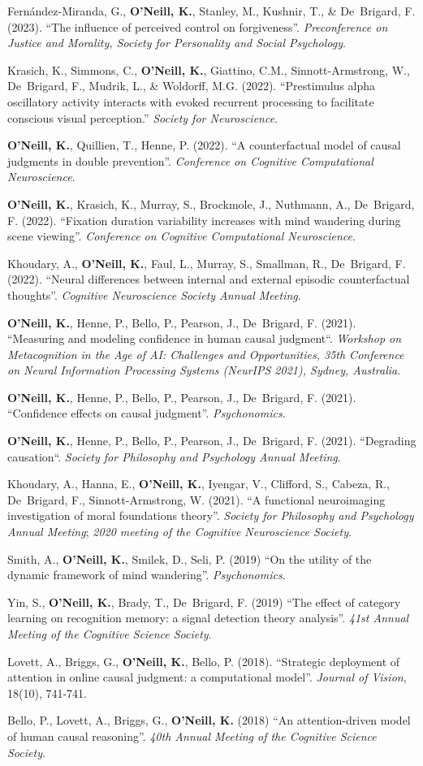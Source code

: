 Fern\'{a}ndez-Miranda, G., \textbf{O’Neill, K.}, Stanley, M., Kushnir,
T., \& De~Brigard, F. (2023). ``The influence of perceived control on
forgiveness''. \emph{Preconference on Justice and Morality, Society
for Personality and Social Psychology}.

Krasich, K., Simmons, C., \textbf{O'Neill, K.}, Giattino, C.M.,
Sinnott-Armstrong, W., De~Brigard, F., Mudrik, L., \& Woldorff,
M.G. (2022). ``Prestimulus alpha oscillatory activity interacts with
evoked recurrent processing to facilitate conscious visual
perception.'' \emph{Society for Neuroscience}.

\textbf{O'Neill, K.}, Quillien, T., Henne, P. (2022). ``A
counterfactual model of causal judgments in double
prevention''. \emph{Conference on Cognitive Computational
Neuroscience}.

\textbf{O'Neill, K.}, Krasich, K., Murray, S., Brockmole, J.,
Nuthmann, A., De~Brigard, F. (2022). ``Fixation duration variability
increases with mind wandering during scene viewing''. \emph{Conference
on Cognitive Computational Neuroscience}.

Khoudary, A., \textbf{O’Neill, K.}, Faul, L., Murray, S., Smallman,
R., De~Brigard, F. (2022). ``Neural differences between internal and
external episodic counterfactual thoughts''. \emph{Cognitive
Neuroscience Society Annual Meeting}.

\textbf{O'Neill, K.}, Henne, P., Bello, P., Pearson, J., De~Brigard,
F. (2021). ``Measuring and modeling confidence in human causal
judgment``. \emph{Workshop on Metacognition in the Age of AI:
Challenges and Opportunities, 35th Conference on Neural Information
Processing Systems (NeurIPS 2021), Sydney, Australia}.

\textbf{O'Neill, K.}, Henne, P., Bello, P., Pearson, J., De~Brigard,
F. (2021). ``Confidence effects on causal judgment''. \emph{Psychonomics}.

\textbf{O'Neill, K.}, Henne, P., Bello, P., Pearson, J., De~Brigard,
F. (2021). ``Degrading causation``. \emph{Society for Philosophy and
Psychology Annual Meeting}.

Khoudary, A., Hanna, E., \textbf{O’Neill, K.}, Iyengar, V., Clifford,
S., Cabeza, R., De~Brigard, F., Sinnott-Armstrong, W. (2021). ``A
functional neuroimaging investigation of moral foundations
theory''. \emph{Society for Philosophy and Psychology Annual Meeting};
\emph{2020 meeting of the Cognitive Neuroscience Society}.

Smith, A., \textbf{O'Neill, K.}, Smilek, D., Seli, P. (2019) ``On the
utility of the dynamic framework of mind
wandering''. \emph{Psychonomics}.

Yin, S., \textbf{O'Neill, K.}, Brady, T., De~Brigard, F. (2019) ``The
effect of category learning on recognition memory: a signal detection
theory analysis''. \emph{41st Annual Meeting of the Cognitive Science
Society}.

Lovett, A., Briggs, G., \textbf{O'Neill, K.}, Bello,
P. (2018). ``Strategic deployment of attention in online causal
judgment: a computational model''. \emph{Journal of Vision}, 18(10),
741-741.

Bello, P., Lovett, A., Briggs, G., \textbf{O'Neill, K.} (2018) ``An
attention-driven model of human causal reasoning''. \emph{40th Annual
Meeting of the Cognitive Science Society}.
